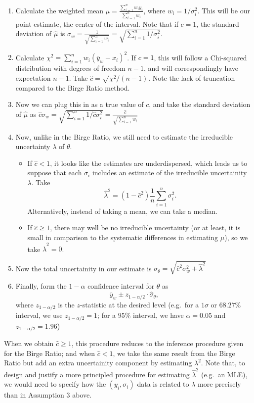 \documentclass[letterpaper,12pt]{article}
\begin{document}
\begin{enumerate}
\item
  Calculate the weighted mean $\hat\mu=\frac{\sum_{i=1}^n w_iy_i}{\sum_{i=1}^nw_i}$, where $w_i=1/\sigma_i^2$. This will be our point estimate, the center of the interval. Note that if $c=1$, the standard deviation of $\hat\mu$ is $\sigma_w=\frac{1}{\sqrt{\sum_{i=1}^nw_i}}=\sqrt{\sum_{i=1}^n1/\sigma_i^2}$.
\item
  Calculate $\chi^2=\sum_{i=1}^n w_i(\bar{y}_w-x_i)^2$. If $c=1$, this will follow a Chi-squared distribution with degrees of freedom $n-1$, and will correspondingly have expectation $n-1$. Take $\hat c=\sqrt{\chi^2/(n-1)}$. Note the lack of truncation compared to the Birge Ratio method.
\item
  Now we can plug this in as a true value of $c$, and take the standard deviation of $\hat\mu$ as $\hat c\sigma_w=\sqrt{\sum_{i=1}^n1/\hat c\sigma_i^2}=\frac{\hat c}{\sqrt{\sum_{i=1}^nw_i}}$
\item
  Now, unlike in the Birge Ratio, we still need to estimate the irreducible uncertainty $\lambda$ of $\theta$.

  \begin{itemize}
  
  \item
    If $\hat c < 1$, it looks like the estimates are underdispersed, which leads us to suppose that each $\sigma_i$ includes an estimate of the irreducible uncertainity $\lambda$. Take \[\hat \lambda^2=(1-\hat c^2)\frac{1}{n}\sum_{i=1}^n \sigma_i^2.\] Alternatively, instead of taking a mean, we can take a median.
  \item
    If $\hat c \geq 1$, there may well be no irreducible uncertainty (or at least, it is small in comparison to the systematic differences in estimating $\mu$), so we take $\hat\lambda^2=0$.
  \end{itemize}
\item
  Now the total uncertainity in our estimate is $\sigma_\theta=\sqrt{\hat c^2\sigma_w^2 + \hat\lambda^2}$
\item
  Finally, form the $1-\alpha$ confidence interval for $\theta$ as \[\bar{y}_w\pm z_{1-{\alpha/2}}\cdot \hat \sigma_\theta,\] where $z_{1-\alpha/2}$ is the $z$-statistic at the desired level (e.g.~for a $1\sigma$ or $68.27\%$ interval, we use $z_{1-\alpha/2}=1$; for a $95\%$ interval, we have $\alpha=0.05$ and $z_{1-\alpha/2}=1.96$)
\end{enumerate}

When we obtain $\hat c\geq 1$, this procedure reduces to the inference procedure given for the Birge Ratio; and when $\hat c<1$, we take the same result from the Birge Ratio but add an extra uncertainity component by estimating $\lambda^2$. Note that, to design and justify a more principled procedure for estimating $\hat \lambda^2$ (e.g.~an MLE), we would need to specify how the $(y_i,\sigma_i)$ data is related to $\lambda$ more precisely than in Assumption 3 above.
\end{document}
